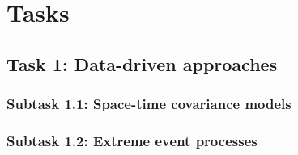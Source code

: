 

\chapter{Tasks}

	\section{Task 1: Data-driven approaches}
	\label{datadriv}
		



		\subsection{Subtask 1.1: Space-time covariance models}
		\label{datadriv:covmod}


		\subsection{Subtask 1.2: Extreme event processes}
		\label{datadriv:extreme}



